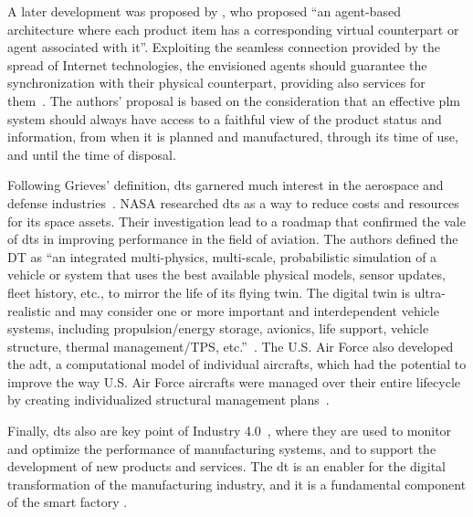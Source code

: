 A later development was proposed by \cite{framlingProductAgentsHandling2003}, who proposed ``an agent-based architecture where each product item has a corresponding virtual counterpart or agent associated with it''. Exploiting the seamless connection provided by the spread of Internet technologies, the envisioned agents should guarantee the synchronization with their physical counterpart, providing also services for them~\parencite{framlingProductAgentsHandling2003}. The authors' proposal is based on the consideration that an effective \acrshort{plm} system should always have access to a faithful view of the product status and information, from when it is planned and manufactured, through its time of use, and until the time of disposal.

Following Grieves' definition, \acrshort{dt}s garnered much interest in the aerospace and defense industries~\parencite{negriReviewRolesDigital2017}.
NASA researched \acrshort{dt}s as a way to reduce costs and resources for its space assets. Their investigation lead to a roadmap that confirmed the vale of \acrshort{dt}s in improving performance in the field of aviation. The authors defined the DT as ``an integrated multi-physics, multi-scale, probabilistic simulation of a vehicle or system that uses the best available physical models, sensor updates, fleet history, etc., to mirror the life of its flying twin. The digital twin is ultra-realistic and may consider one or more important and interdependent vehicle systems, including propulsion/energy storage, avionics, life support, vehicle structure, thermal management/TPS, etc.''~\parencite{shaftoModelingSimulationInformation2010}. The U.S. Air Force also developed the \acrfull{adt}, a computational model of individual aircrafts, which had the potential to improve the way U.S. Air Force aircrafts were managed over their entire lifecycle by creating individualized structural management plans~\parencite{tuegelAirframeDigitalTwin2012,gockelChallengesStructuralLife2012}.

Finally, \acrshort{dt}s also are key point of Industry 4.0~\parencite{brettelHowVirtualizationDecentralization2014,hermannDesignPrinciplesIndustrie2016,vachalekDigitalTwinIndustrial2017,negriReviewRolesDigital2017}, where they are used to monitor and optimize the performance of manufacturing systems, and to support the development of new products and services. The \acrshort{dt} is an enabler for the digital transformation of the manufacturing industry, and it is a fundamental component of the smart factory \parencite{mabkhotRequirementsSmartFactory2018}. 


